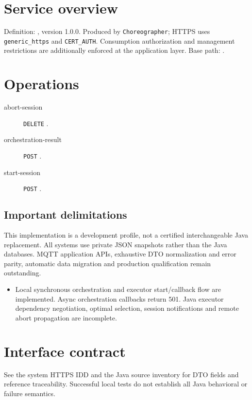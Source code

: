 \documentclass[a4paper]{arrowhead}
\begin{document}
\ArrowheadSetup
\section{Service overview}
Definition: , version 1.0.0. Produced by \texttt{Choreographer}; HTTPS uses \texttt{generic\_https} and \texttt{CERT\_AUTH}. Consumption authorization and management restrictions are additionally enforced at the application layer. Base path: .
\section{Operations}
\begin{description}
\item[abort-session] \texttt{DELETE} .
\item[orchestration-result] \texttt{POST} .
\item[start-session] \texttt{POST} .
\end{description}
\subsection{Important delimitations}
This implementation is a development profile, not a certified interchangeable Java replacement. All systems use private JSON snapshots rather than the Java databases. MQTT application APIs, exhaustive DTO normalization and error parity, automatic data migration and production qualification remain outstanding.
\begin{itemize}
\item Local synchronous orchestration and executor start/callback flow are implemented. Async orchestration callbacks return 501. Java executor dependency negotiation, optimal selection, session notifications and remote abort propagation are incomplete.
\end{itemize}
\section{Interface contract}
See the system HTTPS IDD and the Java source inventory for DTO fields and reference traceability. Successful local tests do not establish all Java behavioral or failure semantics.
\end{document}
